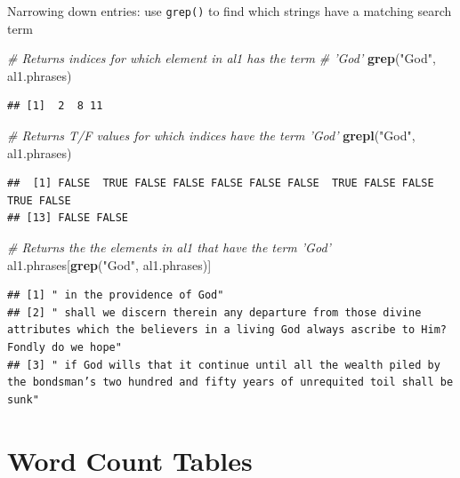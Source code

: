 \documentclass[
]{book}
\newenvironment{Shaded}{\begin{snugshade}}{\end{snugshade}}
\newcommand{\CommentTok}[1]{\textcolor[rgb]{0.56,0.35,0.01}{\textit{#1}}}
\newcommand{\KeywordTok}[1]{\textcolor[rgb]{0.13,0.29,0.53}{\textbf{#1}}}
\newcommand{\NormalTok}[1]{#1}
\newcommand{\StringTok}[1]{\textcolor[rgb]{0.31,0.60,0.02}{#1}}
\begin{document}
Narrowing down entries: use \texttt{grep()} to find which strings have a matching search term

\begin{Shaded}
\begin{Highlighting}[]
\CommentTok{# Returns indices for which element in al1 has the term}
\CommentTok{# 'God'}
\KeywordTok{grep}\NormalTok{(}\StringTok{"God"}\NormalTok{, al1.phrases)}
\end{Highlighting}
\end{Shaded}

\begin{verbatim}
## [1]  2  8 11
\end{verbatim}

\begin{Shaded}
\begin{Highlighting}[]
\CommentTok{# Returns T/F values for which indices have the term 'God'}
\KeywordTok{grepl}\NormalTok{(}\StringTok{"God"}\NormalTok{, al1.phrases)}
\end{Highlighting}
\end{Shaded}

\begin{verbatim}
##  [1] FALSE  TRUE FALSE FALSE FALSE FALSE FALSE  TRUE FALSE FALSE  TRUE FALSE
## [13] FALSE FALSE
\end{verbatim}

\begin{Shaded}
\begin{Highlighting}[]
\CommentTok{# Returns the the elements in al1 that have the term 'God'}
\NormalTok{al1.phrases[}\KeywordTok{grep}\NormalTok{(}\StringTok{"God"}\NormalTok{, al1.phrases)]}
\end{Highlighting}
\end{Shaded}

\begin{verbatim}
## [1] " in the providence of God"                                                                                                                        
## [2] " shall we discern therein any departure from those divine attributes which the believers in a living God always ascribe to Him? Fondly do we hope"
## [3] " if God wills that it continue until all the wealth piled by the bondsman’s two hundred and fifty years of unrequited toil shall be sunk"
\end{verbatim}

\hypertarget{word-count-tables}{%
\section{Word Count Tables}\label{word-count-tables}}
\end{document}
